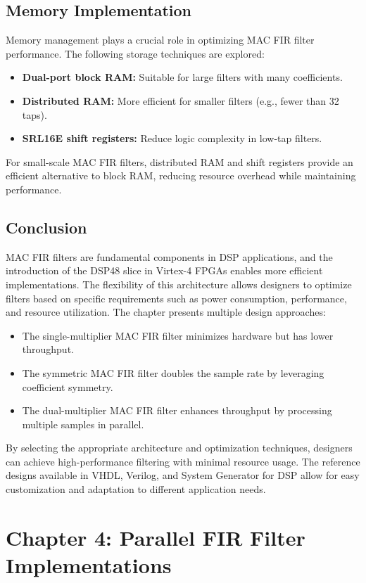\documentclass{article}
\begin{document}
	\subsection{Memory Implementation}
	Memory management plays a crucial role in optimizing MAC FIR filter performance. The following storage techniques are explored:
	\begin{itemize}
		\item \textbf{Dual-port block RAM:} Suitable for large filters with many coefficients.
		\item \textbf{Distributed RAM:} More efficient for smaller filters (e.g., fewer than 32 taps).
		\item \textbf{SRL16E shift registers:} Reduce logic complexity in low-tap filters.
	\end{itemize}
	For small-scale MAC FIR filters, distributed RAM and shift registers provide an efficient alternative to block RAM, reducing resource overhead while maintaining performance.
	
	\subsection{Conclusion}
	MAC FIR filters are fundamental components in DSP applications, and the introduction of the DSP48 slice in Virtex-4 FPGAs enables more efficient implementations. The flexibility of this architecture allows designers to optimize filters based on specific requirements such as power consumption, performance, and resource utilization. The chapter presents multiple design approaches:
	\begin{itemize}
		\item The single-multiplier MAC FIR filter minimizes hardware but has lower throughput.
		\item The symmetric MAC FIR filter doubles the sample rate by leveraging coefficient symmetry.
		\item The dual-multiplier MAC FIR filter enhances throughput by processing multiple samples in parallel.
	\end{itemize}
	By selecting the appropriate architecture and optimization techniques, designers can achieve high-performance filtering with minimal resource usage. The reference designs available in VHDL, Verilog, and System Generator for DSP allow for easy customization and adaptation to different application needs.
	
	
	\section{Chapter 4: Parallel FIR Filter Implementations}
	
\end{document}
